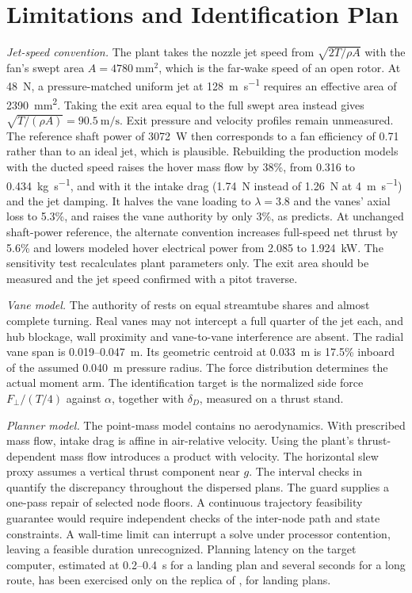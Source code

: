 \documentclass[10pt,letterpaper]{article}
\begin{document}
\section{Limitations and Identification Plan}
\label{sec:limits}

\textit{Jet-speed convention.}
The plant takes the nozzle jet speed from $\sqrt{2T/\rho A}$ with the fan's swept area $A = \SI{4780}{\milli\metre\squared}$, which is the far-wake speed of an open rotor.
At \SI{48}{\newton}, a pressure-matched uniform jet at \SI{128}{\metre\per\second} requires an effective area of \SI{2390}{\milli\metre\squared}. Taking the exit area equal to the full swept area instead gives $\sqrt{T/(\rho A)}=\SI{90.5}{\metre\per\second}$. Exit pressure and velocity profiles remain unmeasured.
The reference shaft power of \SI{3072}{\watt} then corresponds to a fan efficiency of 0.71 rather than to an ideal jet, which is plausible.
Rebuilding the production models with the ducted speed raises the hover mass flow by 38\%, from 0.316 to \SI{0.434}{\kilogram\per\second}, and with it the intake drag (\SI{1.74}{\newton} instead of \SI{1.26}{\newton} at \SI{4}{\metre\per\second}) and the jet damping.
It halves the vane loading to $\lambda = 3.8$ and the vanes' axial loss to 5.3\%, and raises the vane authority by only 3\%, as  predicts.
At unchanged shaft-power reference, the alternate convention increases full-speed net thrust by 5.6\% and lowers modeled hover electrical power from 2.085 to \SI{1.924}{\kilo\watt}. The sensitivity test recalculates plant parameters only.
The exit area should be measured and the jet speed confirmed with a pitot traverse.

\textit{Vane model.}
The authority of  rests on equal streamtube shares and almost complete turning.
Real vanes may not intercept a full quarter of the jet each, and hub blockage, wall proximity and vane-to-vane interference are absent.
The radial vane span is 0.019--\SI{0.047}{\metre}. Its geometric centroid at \SI{0.033}{\metre} is 17.5\% inboard of the assumed \SI{0.040}{\metre} pressure radius. The force distribution determines the actual moment arm.
The identification target is the normalized side force $F_\perp/(T/4)$ against $\alpha$, together with $\delta_D$, measured on a thrust stand.

\textit{Planner model.}
The point-mass model contains no aerodynamics.
With prescribed mass flow, intake drag is affine in air-relative velocity. Using the plant's thrust-dependent mass flow introduces a product with velocity.
The horizontal slew proxy assumes a vertical thrust component near $g$. The interval checks in  quantify the discrepancy throughout the dispersed plans.
The guard supplies a one-pass repair of selected node floors. A continuous trajectory feasibility guarantee would require independent checks of the inter-node path and state constraints.
A wall-time limit can interrupt a solve under processor contention, leaving a feasible duration unrecognized.
Planning latency on the target computer, estimated at 0.2--\SI{0.4}{\second} for a landing plan and several seconds for a long route, has been exercised only on the replica of , for landing plans.
\end{document}
